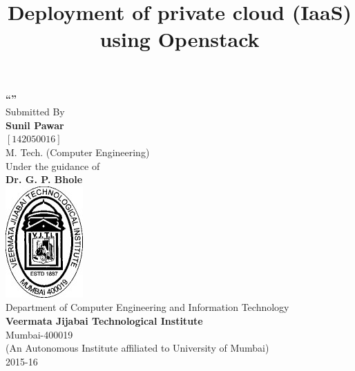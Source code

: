 \begin{titlepage}
\begin{center}
\vspace{0.1cm}
\vspace{0.3cm}
\title{Deployment of private cloud (IaaS) using Openstack}
\makeatletter
\textbf{\LARGE \vspace{0.2cm}\textquotedblleft \@title \textquotedblright }\\
\vspace{0.3cm}
\Large Submitted By\\
\vspace{0.3cm}
\textbf{Sunil Pawar}\\
\vspace{0.1cm}
$[142050016]$\\
{M. Tech. (Computer Engineering)}\\
\vspace{0.5cm}
Under the guidance of\\
\vspace{0.2cm}
\textbf{Dr. G. P. Bhole}\\
\vspace{1cm}
\includegraphics{images/logo.jpg}\\
\vspace{0.3cm}
Department of Computer Engineering and Information Technology\\
\vspace{0.2cm}
\textbf{Veermata Jijabai Technological Institute}\\
\vspace{0.1cm}
Mumbai-400019\\
\vspace{0.2cm}
(An Autonomous Institute affiliated to University of Mumbai)\\
2015-16
\end{center}
\end{titlepage}
\makeatother